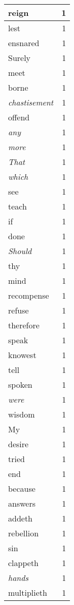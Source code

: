 \begin{center}
\begin{longtable}{l|r}
reign & 1 \\ \hline
lest & 1 \\ \hline
ensnared & 1 \\ \hline
Surely & 1 \\ \hline
meet & 1 \\ \hline
borne & 1 \\ \hline
\emph{chastisement} & 1 \\ \hline
offend & 1 \\ \hline
\emph{any} & 1 \\ \hline
\emph{more} & 1 \\ \hline
\emph{That} & 1 \\ \hline
\emph{which} & 1 \\ \hline
see & 1 \\ \hline
teach & 1 \\ \hline
if & 1 \\ \hline
done & 1 \\ \hline
\emph{Should} & 1 \\ \hline
thy & 1 \\ \hline
mind & 1 \\ \hline
recompense & 1 \\ \hline
refuse & 1 \\ \hline
therefore & 1 \\ \hline
speak & 1 \\ \hline
knowest & 1 \\ \hline
tell & 1 \\ \hline
spoken & 1 \\ \hline
\emph{were} & 1 \\ \hline
wisdom & 1 \\ \hline
My & 1 \\ \hline
desire & 1 \\ \hline
tried & 1 \\ \hline
end & 1 \\ \hline
because & 1 \\ \hline
answers & 1 \\ \hline
addeth & 1 \\ \hline
rebellion & 1 \\ \hline
sin & 1 \\ \hline
clappeth & 1 \\ \hline
\emph{hands} & 1 \\ \hline
multiplieth & 1 \\ \hline
\end{longtable}
\end{center}



